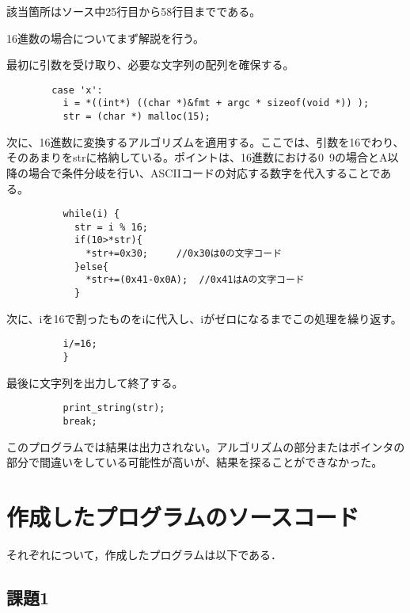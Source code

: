 \documentclass[a4j]{jarticle}
\begin{document}
該当箇所はソース中25行目から58行目までである。

16進数の場合についてまず解説を行う。

最初に引数を受け取り、必要な文字列の配列を確保する。

\begin{verbatim}
        case 'x':
          i = *((int*) ((char *)&fmt + argc * sizeof(void *)) );
          str = (char *) malloc(15);
\end{verbatim}

次に、16進数に変換するアルゴリズムを適用する。ここでは、引数を16でわり、そのあまりをstrに格納している。ポイントは、16進数における0~9の場合とA以降の場合で条件分岐を行い、ASCIIコードの対応する数字を代入することである。

\begin{verbatim}
          while(i) {
            str = i % 16;
            if(10>*str){
              *str+=0x30;     //0x30は0の文字コード
            }else{
              *str+=(0x41-0x0A);  //0x41はAの文字コード
            }
\end{verbatim}

次に、iを16で割ったものをiに代入し、iがゼロになるまでこの処理を繰り返す。

\begin{verbatim}
          i/=16;
          }
\end{verbatim}

最後に文字列を出力して終了する。

\begin{verbatim}
          print_string(str);
          break;
\end{verbatim}

このプログラムでは結果は出力されない。アルゴリズムの部分またはポインタの部分で間違いをしている可能性が高いが、結果を探ることができなかった。



\newpage

%
%

\section{作成したプログラムのソースコード}

それぞれについて，作成したプログラムは以下である．

\subsection{課題1}
\end{document}
